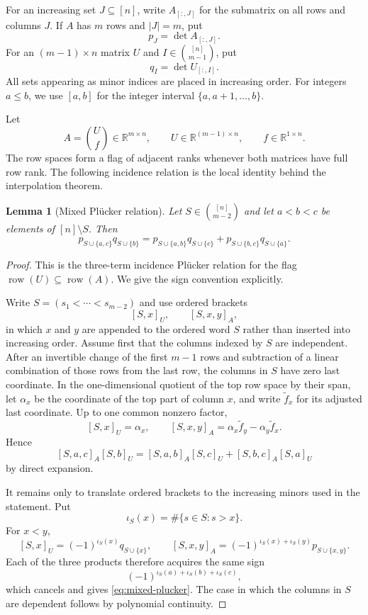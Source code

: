 \documentclass{amsart}
\numberwithin{equation}{section}
\newtheorem{lemma}[theorem]{Lemma}
\theoremstyle{definition}
\theoremstyle{remark}
\newcommand{\RR}{\mathbb R}
\begin{document}
For an increasing set $J\subseteq[n]$, write $A_{[:,J]}$ for the submatrix on all rows and columns $J$.  If $A$ has $m$ rows and $|J|=m$, put
\[
 p_J=\det A_{[:,J]}.
\]
For an $(m-1)\times n$ matrix $U$ and $I\in\binom{[n]}{m-1}$, put
\[
 q_I=\det U_{[:,I]}.
\]
All sets appearing as minor indices are placed in increasing order.  For integers $a\le b$, we use $[a,b]$ for the integer interval $\{a,a+1,\ldots,b\}$.

Let
\begin{equation}\label{eq:row-extension}
 A=\binom{U}{f}\in\RR^{m\times n},
 \qquad U\in\RR^{(m-1)\times n},
 \qquad f\in\RR^{1\times n}.
\end{equation}
The row spaces form a flag of adjacent ranks whenever both matrices have full row rank.  The following incidence relation is the local identity behind the interpolation theorem.

\begin{lemma}[Mixed Pl\"ucker relation]\label{lem:mixed-plucker}
Let $S\in\binom{[n]}{m-2}$ and let $a<b<c$ be elements of $[n]\setminus S$.  Then
\begin{equation}\label{eq:mixed-plucker}
 p_{S\cup\{a,c\}}q_{S\cup\{b\}}
 =p_{S\cup\{a,b\}}q_{S\cup\{c\}}
 +p_{S\cup\{b,c\}}q_{S\cup\{a\}}.
\end{equation}
\end{lemma}

\begin{proof}
This is the three-term incidence Pl\"ucker relation for the flag
$\operatorname{row}(U)\subseteq\operatorname{row}(A)$.  We give the sign convention explicitly.

Write $S=(s_1<\cdots<s_{m-2})$ and use ordered brackets
\[
 [S,x]_U,\qquad [S,x,y]_A,
\]
in which $x$ and $y$ are appended to the ordered word $S$ rather than inserted into increasing order.  Assume first that the columns indexed by $S$ are independent.  After an invertible change of the first $m-1$ rows and subtraction of a linear combination of those rows from the last row, the columns in $S$ have zero last coordinate.  In the one-dimensional quotient of the top row space by their span, let $\alpha_x$ be the coordinate of the top part of column $x$, and write $\widetilde f_x$ for its adjusted last coordinate.  Up to one common nonzero factor,
\[
 [S,x]_U=\alpha_x,
 \qquad
 [S,x,y]_A=\alpha_x\widetilde f_y-\alpha_y\widetilde f_x.
\]
Hence
\[
 [S,a,c]_A[S,b]_U
 =[S,a,b]_A[S,c]_U+[S,b,c]_A[S,a]_U
\]
by direct expansion.

It remains only to translate ordered brackets to the increasing minors used in the statement.  Put
\[
 \iota_S(x)=\#\{s\in S:s>x\}.
\]
For $x<y$,
\[
 [S,x]_U=(-1)^{\iota_S(x)}q_{S\cup\{x\}},
 \qquad
 [S,x,y]_A=(-1)^{\iota_S(x)+\iota_S(y)}
 p_{S\cup\{x,y\}}.
\]
Each of the three products therefore acquires the same sign
\[
 (-1)^{\iota_S(a)+\iota_S(b)+\iota_S(c)},
\]
which cancels and gives \eqref{eq:mixed-plucker}.  The case in which the columns in $S$ are dependent follows by polynomial continuity.
\end{proof}
\end{document}
